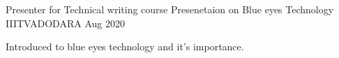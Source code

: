 \begin{cventries}
  \cventry
    {Presenter for Technical writing course}
    {Presenetaion on Blue eyes Technology}
    {IIITVADODARA}
    {Aug 2020}
    {
      \begin{cvitems}
        \item {Introduced to blue eyes technology and it's importance.}
      \end{cvitems}
    }
\end{cventries}
